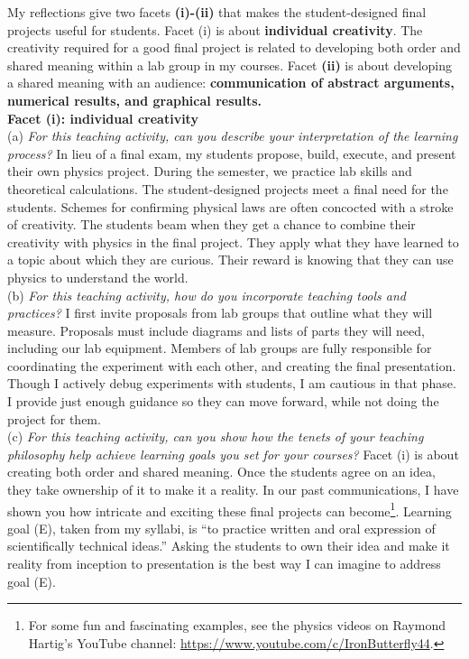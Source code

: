 \documentclass[../../../main.tex]{subfiles}
\begin{document}
My reflections give two facets \textbf{(i)-(ii)} that makes the student-designed final projects useful for students.  Facet (i) is about \textbf{individual creativity}.  The creativity required for a good final project is related to developing both order and shared meaning within a lab group in my courses.  Facet \textbf{(ii)} is about developing a shared meaning with an audience: \textbf{communication of abstract arguments, numerical results, and graphical results.}
\\
\vspace{0.15cm}
\textbf{Facet (i): individual creativity}
\\
\vspace{0.15cm}
(a) \textit{For this teaching activity, can you describe your interpretation of the learning process?} In lieu of a final exam, my students propose, build, execute, and present their own physics project.  During the semester, we practice lab skills and theoretical calculations.  The student-designed projects meet a final need for the students.  Schemes for confirming physical laws are often concocted with a stroke of creativity.  The students beam when they get a chance to combine their creativity with physics in the final project.  They apply what they have learned to a topic about which they are curious.  Their reward is knowing that they can use physics to understand the world. 
\\
\vspace{0.15cm}
(b) \textit{For this teaching activity, how do you incorporate teaching tools and practices?}  I first invite proposals from lab groups that outline what they will measure.  Proposals must include diagrams and lists of parts they will need, including our lab equipment.  Members of lab groups are fully responsible for coordinating the experiment with each other, and creating the final presentation.  Though I actively debug experiments with students, I am cautious in that phase. I provide just enough guidance so they can move forward, while not doing the project for them.
\\
\vspace{0.15cm}
(c) \textit{For this teaching activity, can you show how the tenets of your teaching philosophy help achieve learning goals you set for your courses?} Facet (i) is about creating both order and shared meaning.  Once the students agree on an idea, they take ownership of it to make it a reality.  In our past communications, I have shown you how intricate and exciting these final projects can become\footnote{For some fun and fascinating examples, see the physics videos on Raymond Hartig's YouTube channel: \url{https://www.youtube.com/c/IronButterfly44}.}.  Learning goal (E), taken from my syllabi, is ``to practice written and oral expression of scientifically technical ideas.''  Asking the students to own their idea and make it reality from inception to presentation is the best way I can imagine to address goal (E).
\end{document}
